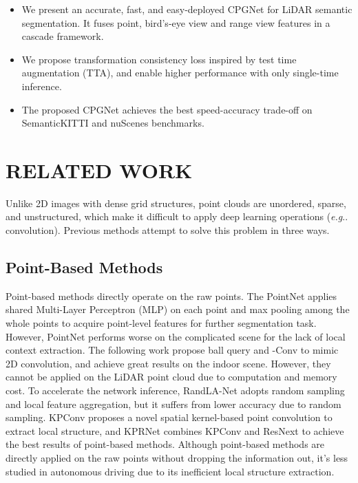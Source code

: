 \documentclass[letterpaper, 10 pt, conference]{ieeeconf}
\makeatletter
\DeclareRobustCommand\onedot{\futurelet\@let@token\@onedot}
\def\@onedot{\ifx\@let@token.\else.\null\fi\xspace}
\def\eg{\emph{e.g}\onedot} \def\Eg{\emph{E.g}\onedot}
\makeatother
\begin{document}
\begin{itemize}
\item We present an accurate, fast, and easy-deployed CPGNet
for LiDAR semantic segmentation. It fuses point, bird’s-eye view and range view features in a cascade framework.

\item We propose transformation consistency loss inspired by test time augmentation (TTA), and enable higher performance  with only single-time inference.

\item The proposed CPGNet achieves the best speed-accuracy trade-off on SemanticKITTI and nuScenes benchmarks.
\end{itemize}

\section{RELATED WORK}
Unlike 2D images with dense grid structures, point clouds are unordered, sparse, and unstructured, which make it difficult to apply deep learning operations (\eg convolution). Previous methods attempt to solve this problem in three ways.

\subsection{Point-Based Methods}
Point-based methods directly operate on the raw points. The PointNet \cite{qi2017pointnet} applies shared Multi-Layer Perceptron (MLP) on each point and max pooling among the whole points to acquire point-level features for further segmentation task. However, PointNet performs worse on the complicated scene for the lack of local context extraction. The following work \cite{qi2017pointnetplus, li2018pointcnn} propose ball query and -Conv to mimic 2D convolution, and achieve great results on the indoor scene. However, they cannot be applied on the LiDAR point cloud due to computation and memory cost. To accelerate the network inference, RandLA-Net \cite{hu2020randla} adopts random sampling and local feature aggregation, but it suffers from lower accuracy due to random sampling. KPConv \cite{thomas2019kpconv} proposes a novel spatial kernel-based
point convolution to extract local structure, and KPRNet \cite{kochanov2020kprnet} combines KPConv and ResNext \cite{xie2017aggregated} to achieve the best results of point-based methods. Although point-based methods are directly applied on the raw points without dropping the information out, it’s less studied in autonomous driving due to its inefficient local structure extraction.
\end{document}
